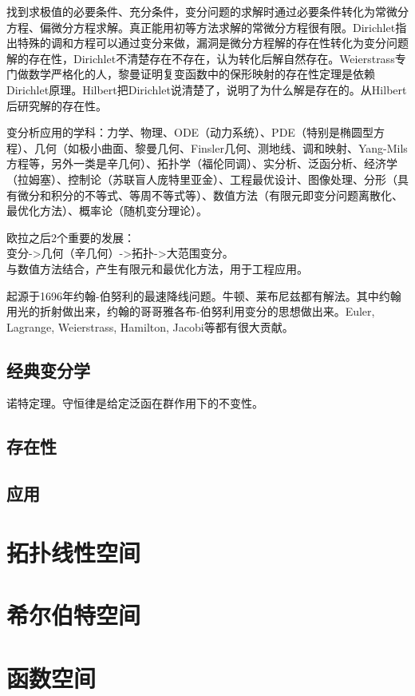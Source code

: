 \documentclass[UTF8]{../09-Mathematics}
\begin{document}
找到求极值的必要条件、充分条件，变分问题的求解时通过必要条件转化为常微分方程、偏微分方程求解。真正能用初等方法求解的常微分方程很有限。Dirichlet指出特殊的调和方程可以通过变分来做，漏洞是微分方程解的存在性转化为变分问题解的存在性，Dirichlet不清楚存在不存在，认为转化后解自然存在。Weierstrass专门做数学严格化的人，黎曼证明复变函数中的保形映射的存在性定理是依赖Dirichlet原理。Hilbert把Dirichlet说清楚了，说明了为什么解是存在的。从Hilbert后研究解的存在性。

变分析应用的学科：力学、物理、ODE（动力系统）、PDE（特别是椭圆型方程）、几何（如极小曲面、黎曼几何、Finsler几何、测地线、调和映射、Yang-Mils方程等，另外一类是辛几何）、拓扑学（福伦同调）、实分析、泛函分析、经济学（拉姆塞）、控制论（苏联盲人庞特里亚金）、工程最优设计、图像处理、分形（具有微分和积分的不等式、等周不等式等）、数值方法（有限元即变分问题离散化、最优化方法）、概率论（随机变分理论）。

欧拉之后2个重要的发展：\\
变分->几何（辛几何）->拓扑->大范围变分。\\
与数值方法结合，产生有限元和最优化方法，用于工程应用。


起源于1696年约翰-伯努利的最速降线问题。牛顿、莱布尼兹都有解法。其中约翰用光的折射做出来，约翰的哥哥雅各布-伯努利用变分的思想做出来。Euler, Lagrange, Weierstrass, Hamilton, Jacobi等都有很大贡献。

\subsection{经典变分学}

诺特定理。守恒律是给定泛函在群作用下的不变性。

 


\subsection{存在性}
\subsection{应用}


\section{拓扑线性空间}
\section{希尔伯特空间}
\section{函数空间}
\end{document}
